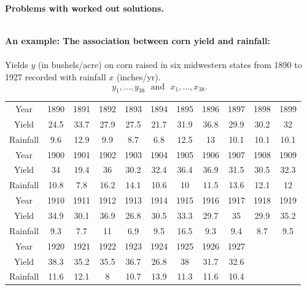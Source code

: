\begin{center}\large\textbf{Problems with worked out solutions.}\\
\normalsize \end{center}
\large \hlinewd{2pt}
~\\
\textbf{An example: The association between corn yield and rainfall:}\\~\\
Yields $y$ (in bushels/acre) on corn raised in six midwestern states from 1890 to 1927 recorded with rainfall $x$ (inches/yr). \\
$$ y_1,\ldots,y_{38} \ \ \ \mbox{and} \ \ \  x_1,\ldots,x_{38}.$$
\begin{center}
\begin{tabular}{|c|cccccccccc|} \hline
Year & 1890 & 1891 & 1892 & 1893 & 1894 & 1895 & 1896 & 1897 & 1898 & 1899 \\
Yield  & 24.5 & 33.7 & 27.9 & 27.5 & 21.7 & 31.9 & 36.8 & 29.9 & 30.2 & 32\\
Rainfall & 9.6 & 12.9 & 9.9 & 8.7 & 6.8 & 12.5 & 13 & 10.1 & 10.1 & 10.1  \\  \hline
Year & 1900 & 1901 & 1902 & 1903 & 1904 & 1905 & 1906 & 1907 & 1908 & 1909 \\
Yield  & 34 & 19.4 & 36 & 30.2 & 32.4 & 36.4 & 36.9 & 31.5 & 30.5 & 32.3\\
Rainfall & 10.8 & 7.8 & 16.2 & 14.1 & 10.6 & 10 & 11.5 & 13.6 & 12.1 & 12 \\ \hline
Year & 1910 & 1911 & 1912 & 1913 & 1914 & 1915 & 1916 & 1917 & 1918 & 1919 \\
Yield & 34.9 & 30.1 & 36.9 & 26.8 & 30.5 & 33.3 & 29.7 & 35 & 29.9 & 35.2\\
Rainfall & 9.3 & 7.7 & 11 & 6.9 & 9.5 & 16.5 & 9.3 & 9.4 & 8.7 & 9.5 \\ \hline
Year & 1920 & 1921 & 1922 & 1923 & 1924 & 1925 & 1926 & 1927 & &\\
Yield & 38.3 & 35.2 & 35.5 & 36.7 & 26.8 & 38 & 31.7 & 32.6 & &\\
Rainfall & 11.6 & 12.1 & 8 & 10.7 & 13.9 & 11.3 & 11.6 & 10.4 & &\\ \hline
\end{tabular}
\end{center}

\newpage

